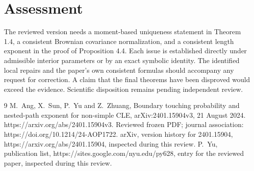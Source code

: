 \documentclass[10pt]{article}
\begin{document}
\section*{Assessment}
The reviewed version needs a moment-based uniqueness statement in Theorem 1.4, a consistent Brownian covariance normalization, and a consistent length exponent in the proof of Proposition 4.4. Each issue is established directly under admissible interior parameters or by an exact symbolic identity. The identified local repairs and the paper’s own consistent formulas should accompany any request for correction. A claim that the final theorems have been disproved would exceed the evidence. Scientific disposition remains pending independent review.\par
9 M. Ang, X. Sun, P. Yu and Z. Zhuang, Boundary touching probability and nested-path exponent for non-simple CLE, arXiv:2401.15904v3, 21 August 2024. https://arxiv.org/abs/2401.15904v3. Reviewed frozen PDF; journal association: https://doi.org/10.1214/24-AOP1722. arXiv, version history for 2401.15904, https://arxiv.org/abs/2401.15904, inspected during this review. P. Yu, publication list, https://sites.google.com/nyu.edu/py628, entry for the reviewed paper, inspected during this review.\par
\end{document}
